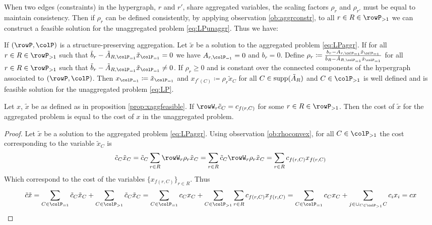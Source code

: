 {When two edges (constraints) in the hypergraph, \(r\) and \(r'\), share aggregated variables, the scaling factors \(\rho_r\) and \(\rho_{r'}\) must be equal to maintain consistency. 
Then if \(\rho_r\) can be defined consistently, by applying observation \ref{ob:aggrconstr}, to all \(r \in R \in \rowP_{>1}\) we can construct a feasible solution for the unaggregated problem \eqref{eq:LPunaggr}. Thus we have: 
\begin{proposition}
\label{prop:xaggfeasible}
If \((\rowP, \colP)\) is a structure-preserving aggregation. Let \(\tilde{x}\) be a solution 
to the aggregated problem \eqref{eq:LPaggr}. If for all \(r \in R \in \rowP_{>1}\) such that  \(\tilde{b}_r - \tilde{A}_{R, \colP_{=1}} \tilde{x}_{\colP_{=1}} = 0\) we have \(A_{r,\colP_{=1}} = 0\) and \(b_r=0\).
Define \(\rho_r \coloneqq \frac{b_r - A_{r, \colP_{=1}} \tilde{x}_{\colP_{=1}}}{\tilde{b}_R - \tilde{A}_{R, \colP_{=1}} \tilde{x}_{\colP_{=1}}}\) for all \(r \in R \in \rowP_{>1}\) such that   \(\tilde{b}_r - \tilde{A}_{R, \colP_{=1}} \tilde{x}_{\colP_{=1}} \neq 0\). If \(\rho_r \geq 0\) and is constant over the connected components of the hypergraph associated to \((\rowP, \colP)\). 
Then \(x_{\colP_{=1}} \coloneqq \tilde{x}_{\colP_{=1}}\) and \(x_{f^r(C)} \coloneqq \rho_r \tilde{x}_C\) for all \(C \in \operatorname{supp}(\tilde{A}_R)\) and \(C \in \colP_{>1}\) is well defined and is feasible solution for the unaggregated problem \eqref{eq:LP}.
\end{proposition}


\begin{observation}
  \label{ob:costpreserving}
  Let \(x\), \(\tilde{x}\) be as defined as in proposition \ref{prop:xaggfeasible}. If \(\rowW_r\tilde{c}_C = c_{f(r,C)}\) for some \(r \in R \in \rowP_{>1}\). Then the cost of \(\tilde{x}\) for the aggregated problem 
  is equal to the cost of \(x\) in the unaggregated problem. 
\end{observation}
\begin{proof}
  Let \(\tilde{x}\) be a solution to the aggregated problem \eqref{eq:LPaggr}. Using observation \ref{ob:rhoconvex}, for all \(C \in \colP_{>1}\) the cost corresponding to the variable \(\tilde{x}_C\) is 
  \[
  \tilde{c}_C\tilde{x}_C = \tilde{c}_C\sum_{r \in R}\rowW_r\rho_r\tilde{x}_C = \sum_{r \in R}\tilde{c}_C\rowW_r\rho_r\tilde{x}_C  = \sum_{r \in R}c_{f(r,C)}x_{f(r,C)}
  \]
  Which correspond to the cost of the variables \(\{x_{f(r,C)}\}_{r \in R}\). Thus
  \[
  \tilde{c}\tilde{x} = \sum_{C \in \colP_{=1}}\tilde{c}_C\tilde{x}_C + \sum_{C \in \colP_{>1}}\tilde{c}_C\tilde{x}_C = \sum_{C \in \colP_{=1}}c_Cx_C + \sum_{C \in \colP_{>1}}\sum_{r \in R}c_{f(r,C)}x_{f(r,C)} =  \sum_{C \in \colP_{=1}}c_Cx_C + \sum_{j \in \cup_{C \in \colP_{>1}}C}c_{i}x_{i} =  cx
  \]


\end{proof}}
